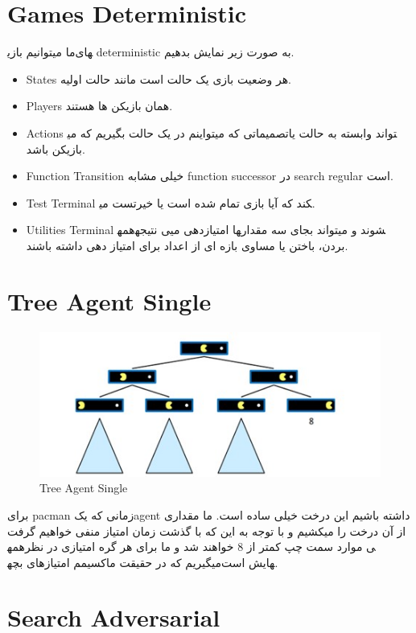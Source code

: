 \section{Games Deterministic}
ما میتوانیم بازی‎های deterministic به صورت زیر نمایش بدهیم.
\begin{itemize}
    \item
States هر وضعیت بازی یک حالت است مانند حالت اولیه.
    \item
Players همان بازیکن ها هستند.
    \item
Actions تصمیماتی که میتواینم در یک حالت بگیریم که می‎تواند وابسته به حالت یا بازیکن باشد. 
    \item
Function Transition خیلی مشابه function successor در search regular است.
    \item
Test Terminal تست می‎کند که آیا بازی تمام شده است یا خیر.
    \item
Utilities Terminal همه‎ی نتیجه‎ها امتیازدهی می‎شوند و میتواند بجای سه مقدار بردن، باختن یا مساوی بازه ای از اعداد برای امتیاز دهی داشته باشند.
\end{itemize}


\section{Tree Agent Single}

\begin{figure}[h!]
    \centering
    \includegraphics[width=0.8\linewidth]{images/singleagenttree.jpg}
    \caption{Tree Agent Single}
\end{figure}

برای pacman زمانی که یکagent   داشته باشیم این درخت خیلی ساده است. ما مقداری از آن درخت را میکشیم و با توجه به این که با گذشت زمان امتیاز منفی خواهیم گرفت همه‎ی موارد سمت چپ کمتر از 8 خواهند شد و ما برای هر گره امتیازی در نظر میگیریم که در حقیقت ماکسیمم امتیازهای بچه‎هایش است.



\section{Search Adversarial}

